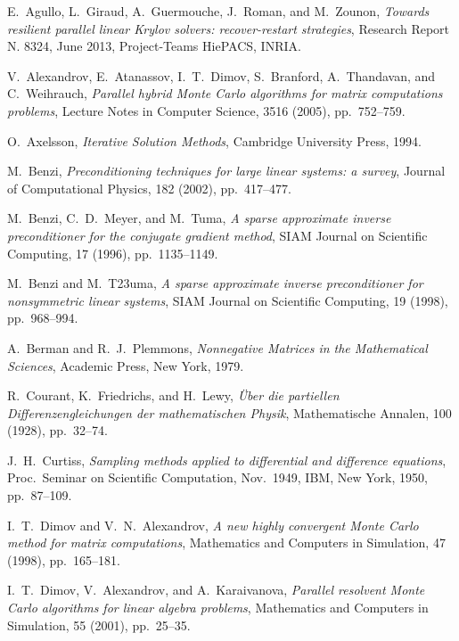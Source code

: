 \documentclass[final,leqno,onefignum,onetabnum]{siamltex1213}
\begin{document}
\begin{thebibliography}{9}

  {\sc E.~Agullo, L.~Giraud, A.~Guermouche, J.~Roman, and M.~Zounon},
  {\em Towards resilient parallel linear Krylov solvers: recover-restart
  strategies},
  Research Report N. 8324, June 2013, Project-Teams HiePACS, INRIA.
 
 {\sc V.~Alexandrov, E.~Atanassov, I.~T.~Dimov, S.~Branford, A.~Thandavan, and 
C.~Weihrauch},
{\em Parallel hybrid Monte Carlo algorithms for matrix computations 
problems},
Lecture Notes in Computer Science,
3516 (2005), pp.~752--759.
 
 {\sc O.~Axelsson},
 {\em Iterative Solution Methods},
 Cambridge University Press, 1994. 
 
 {\sc M.~Benzi}, 
 {\em Preconditioning techniques for large linear systems: a survey},
 Journal of Computational Physics,
 182 (2002), pp.~417--477.

 {\sc M.~Benzi, C.~D.~Meyer, and M.~Tuma},
 {\em A sparse approximate inverse preconditioner for the 
 conjugate gradient method},
  SIAM Journal on Scientific Computing,
  17 (1996), pp.~1135--1149.

 {\sc M.~Benzi and M.~T\accent23uma},
 {\em A sparse approximate inverse preconditioner for nonsymmetric linear 
systems},
  SIAM Journal on Scientific Computing,
  19 (1998), pp.~968--994.

{\sc A.~Berman and R.~J.~Plemmons},
{\em Nonnegative Matrices in the Mathematical Sciences}, 
Academic Press, New York, 1979.

{\sc R.~Courant, K.~Friedrichs, and H.~Lewy},
{\em \"Uber die partiellen Differenzengleichungen der mathematischen
Physik}, Mathematische Annalen, 100 (1928), pp.~32--74.

{\sc J.~H.~Curtiss},
{\em Sampling methods applied to differential and difference equations},
Proc.~Seminar on Scientific Computation, Nov.~1949, IBM, New York, 1950, pp.~87--109. 

 {\sc I.~T.~Dimov and V.~N.~Alexandrov}, 
 {\em A new highly convergent Monte Carlo method for matrix computations},
 Mathematics and Computers in Simulation, 
 47 (1998), pp.~165--181.
 
 {\sc I.~T.~Dimov, V.~Alexandrov, and A.~Karaivanova},
 {\em Parallel resolvent Monte Carlo algorithms for linear algebra 
 problems},
 Mathematics and Computers in Simulation,
 55 (2001), pp.~25--35.


\end{thebibliography}
\end{document}
